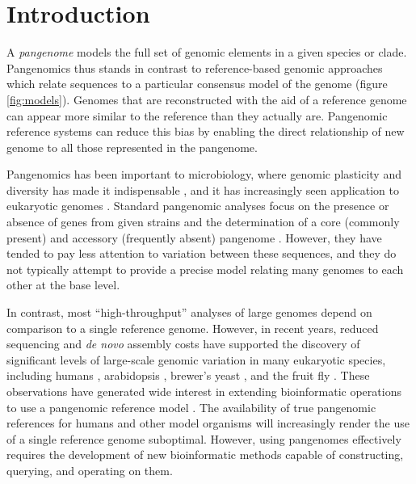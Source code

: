 \section{Introduction}
\label{sec:intro}

A \emph{pangenome} models the full set of genomic elements in a given species or clade.
Pangenomics thus stands in contrast to reference-based genomic approaches which relate sequences to a particular consensus model of the genome (figure \ref{fig:models}).
Genomes that are reconstructed with the aid of a reference genome can appear more similar to the reference than they actually are.
Pangenomic reference systems can reduce this bias by enabling the direct relationship of new genome to all those represented in the pangenome.

Pangenomics has been important to microbiology, where genomic plasticity and diversity has made it indispensable \cite{Vernikos2015}, and it has increasingly seen application to eukaryotic genomes \cite{cao2011whole,gao2019tomato,Ou_2018}.
Standard pangenomic analyses focus on the presence or absence of genes from given strains and the determination of a core (commonly present) and accessory (frequently absent) pangenome \cite{page2015roary}.
However, they have tended to pay less attention to variation between these sequences, and they do not typically attempt to provide a precise model relating many genomes to each other at the base level.

In contrast, most ``high-throughput'' analyses of large genomes depend on comparison to a single reference genome.
However, in recent years, reduced sequencing and \emph{de novo} assembly costs have supported the discovery of significant levels of large-scale genomic variation in many eukaryotic species, including humans \cite{sudmant2015integrated,Hehir-Kwa2016-hb,chaisson2018multi,Audano_2019}, arabidopsis \cite{alonso2016arabidopsis}, brewer's yeast \cite{yue2017contrasting}, and the fruit fly \cite{chakraborty2018hidden}.
These observations have generated wide interest in extending bioinformatic operations to use a pangenomic reference model \cite{computational2016computational}.
The availability of true pangenomic references for humans \cite{Church2015-vt} and other model organisms will increasingly render the use of a single reference genome suboptimal.
However, using pangenomes effectively requires the development of new bioinformatic methods capable of constructing, querying, and operating on them.

